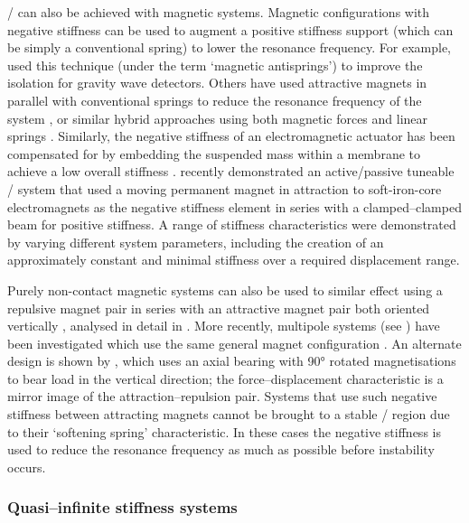 \documentclass[11pt,a4paper]{memoir}
\begin{document}
\QZS/ can also be achieved with magnetic systems.
Magnetic configurations with negative stiffness can be used to augment a positive stiffness support (which can be simply a conventional spring) to lower the resonance frequency.
For example, \textcite{beccaria1997} used this technique (under the term `magnetic antisprings') to improve the isolation for gravity wave detectors.
Others have used attractive magnets in parallel with conventional springs to reduce the resonance frequency of the system \parencite{carrella2008-jsv}, or similar hybrid approaches using both magnetic forces and linear springs \parencite{xu2013-jsv}.
Similarly, the negative stiffness of an electromagnetic actuator has been compensated for by embedding the suspended mass within a membrane to achieve a low overall stiffness \cite{sato2001}.
\textcite{zhou2010-jsv} recently demonstrated an active/passive tuneable \qzs/ system that used a moving permanent magnet in attraction to soft-iron-core electromagnets as the negative stiffness element in series with a clamped--clamped beam for positive stiffness.
A range of stiffness characteristics were demonstrated by varying different system parameters, including the creation of an approximately constant and minimal stiffness over a required displacement range.

Purely non-contact magnetic systems can also be used to similar effect using a repulsive magnet pair in series with an attractive magnet pair both oriented vertically \cite{robertson2006-activeconf,robertson2007-icsv}, analysed in detail in .
More recently, multipole systems (see ) have been investigated which use the same general magnet configuration \cite{janssen2009-jsdd}.
An alternate design is shown by \textcite{hol2006}, which uses an axial bearing with \ang{90} rotated magnetisations to bear load in the vertical direction; the force--displacement characteristic is a mirror image of the attraction--repulsion pair.
Systems that use such negative stiffness between attracting magnets cannot be brought to a stable \qzs/ region due to their `softening spring' characteristic.
In these cases the negative stiffness is used to reduce the resonance frequency as much as possible before instability occurs.


\subsubsection{Quasi--infinite stiffness systems}
\end{document}

